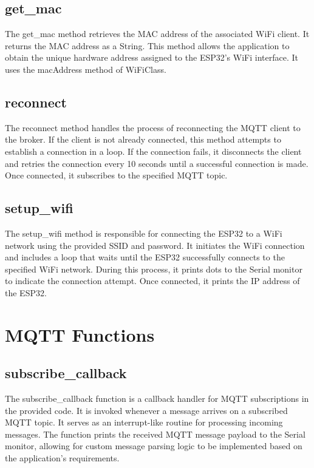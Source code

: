 \subsection{get\_mac}
\label{sub:get_mac}
The get\_mac method retrieves the MAC address of the associated WiFi client. 
It returns the MAC address as a String. 
This method allows the application to obtain the unique hardware address assigned to the ESP32's WiFi interface. 
It uses the macAddress method of WiFiClass. 

\subsection{reconnect}
\label{sub:reconnect}
The reconnect method handles the process of reconnecting the MQTT client to the broker. 
If the client is not already connected, this method attempts to establish a connection in a loop. 
If the connection fails, it disconnects the client and retries the connection every 10 seconds until a successful connection is made. 
Once connected, it subscribes to the specified MQTT topic. 

\subsection{setup\_wifi}
\label{sub:setup_wifi}
The setup\_wifi method is responsible for connecting the ESP32 to a WiFi network using the provided SSID and password. It initiates the WiFi connection and includes a loop that waits until the ESP32 successfully connects to the specified WiFi network. 
During this process, it prints dots to the Serial monitor to indicate the connection attempt. 
Once connected, it prints the IP address of the ESP32. 


\section{MQTT Functions}
\label{sec:MQTT_Functions}
\subsection{subscribe\_callback}
\label{sub:subscribe_callback}
The subscribe\_callback function is a callback handler for MQTT subscriptions in the provided code. 
It is invoked whenever a message arrives on a subscribed MQTT topic. 
It serves as an interrupt-like routine for processing incoming messages. 
The function prints the received MQTT message payload to the Serial monitor, allowing for custom message parsing logic to be implemented based on the application's requirements.

